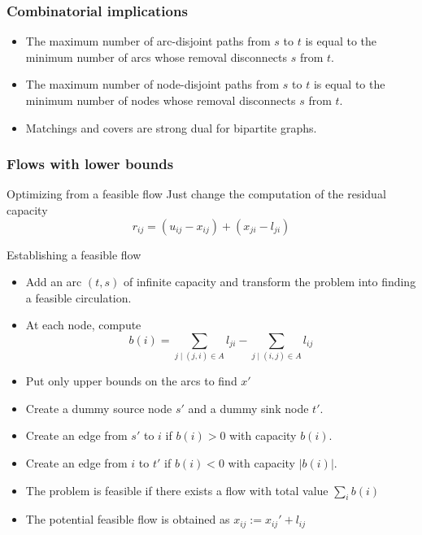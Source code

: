 \documentclass[9pt,handout]{beamer}
\begin{document}
\begin{frame}
\frametitle{Combinatorial implications}
\begin{itemize}
\item<1-> The maximum number of \alert{arc-disjoint paths} from $s$ to $t$
is equal to the minimum number of arcs whose \alert{removal disconnects} $s$ from $t$.
\item<1-> The maximum number of \alert{node-disjoint} paths from $s$ to $t$ is
equal to the minimum number of \alert{nodes whose removal} disconnects $s$ from $t$.
\item<1-> Matchings and covers are strong dual for \alert{bipartite graphs}.
\end{itemize}
\end{frame}
\begin{frame}
\frametitle{Flows with lower bounds}
\begin{block}{Optimizing from a feasible flow}
Just change the computation of the \alert{residual capacity}
$$ r_{ij} = (u_{ij}-x_{ij}) + (x_{ji}-l_{ji})$$
\end{block}
\begin{block}{Establishing a feasible flow}
\begin{itemize}
\item<2-> Add an arc $(t,s)$ of \alert{infinite capacity}
and transform the problem into finding a \alert{feasible circulation}.
\item<2-> At each node, compute 
$$b(i) = \sum_{j\mid (j,i)\in A} l_{ji} - \sum_{j\mid (i,j)\in A} l_{ij}$$
\item<2-> Put only \alert{upper bounds} on the arcs to find $x'$
\item<2-> Create a \alert{dummy source node} $s'$ and a \alert{dummy sink node} $t'$.
\item<2-> Create an edge from $s'$ to $i$ if $b(i)>0$ with capacity $b(i)$.
\item<2-> Create an edge from $i$ to $t'$ if $b(i)<0$ with capacity $|b(i)|$.
\item<2-> The problem is feasible if there exists a flow with total value $\sum_ib(i)$
\item<2-> The potential feasible flow is obtained as $x_{ij}:=x_{ij}'+l_{ij}$
\end{itemize}
\end{block}
\end{frame}
\end{document}
